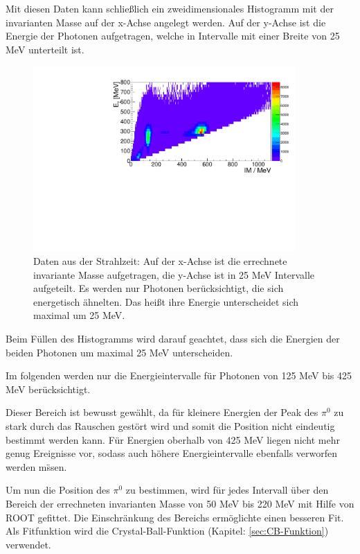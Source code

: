 \documentclass[a4paper,11pt,oneside,final,german,openbib,pdftex]{scrbook}
\begin{document}
{Mit diesen Daten kann schließlich ein zweidimensionales Histogramm mit der invarianten Masse auf der x-Achse angelegt werden. Auf der y-Achse ist die Energie der Photonen aufgetragen, welche in Intervalle mit einer Breite von 25 MeV unterteilt ist. 


\begin{figure}[h!]
	\begin{center}
		\includegraphics[width=100mm]{NewCalib/Strahlzeit2014/20171904Uncharged2DHist}
	
		\caption[Strahlzeit: 2D-Histogramm; Symmetrische Photonen]{Daten aus der Strahlzeit: Auf der x-Achse ist die errechnete invariante Masse aufgetragen, die y-Achse ist in 25 MeV Intervalle aufgeteilt. Es werden nur Photonen ber\"ucksichtigt, die sich energetisch \"ahnelten. Das hei{\ss}t ihre Energie unterscheidet sich maximal um 25 MeV.}
			\label{fig:Energy-Interval-Hist-All-Bins}
	\end{center}
\end{figure}

Beim Füllen des Histogramms wird darauf geachtet, dass sich die Energien der beiden Photonen um maximal 25 MeV unterscheiden.

Im folgenden werden nur die Energieintervalle f\"ur Photonen von 125 MeV bis 425 MeV ber\"ucksichtigt.

Dieser Bereich ist bewusst gew\"ahlt, da f\"ur kleinere Energien der Peak des $\pi^0$ zu stark durch das Rauschen gest\"ort wird und somit die Position nicht eindeutig bestimmt werden kann. F\"ur Energien oberhalb von 425 MeV liegen nicht mehr genug Ereignisse vor, sodass auch h\"ohere Energieintervalle ebenfalls verworfen werden m\"ssen. 


Um nun die Position des $\pi^0$ zu bestimmen, wird für jedes Intervall über den Bereich der errechneten invarianten Masse von 50 MeV bis 220 MeV mit Hilfe von ROOT gefittet. Die Einschr\"ankung des Bereichs erm\"oglichte einen besseren Fit. Als Fitfunktion wird die Crystal-Ball-Funktion (Kapitel: \ref{sec:CB-Funktion}) verwendet. 

}
\end{document}
